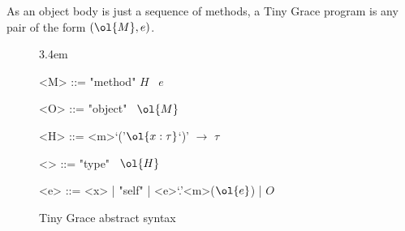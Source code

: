 As an object body is just a sequence of methods, a Tiny Grace program is any
pair of the form $(\ol{M}, e)$.

\begin{figure}[h]
  \centering

  \grammarindent3.4em
  \renewcommand{\grammarlabel}[2]{$#1$\hfill#2}
  \renewcommand{\syntleft}{\itshape}
  \renewcommand{\syntright}{}
  \renewcommand{\ulitleft}{\sffamily\bfseries}
  \renewcommand{\litleft}{\sffamily}
  \renewcommand{\litright}{}

  \vspace{1em}
  \begin{minipage}{11.7em}
    \begin{grammar}
      <M> ::= "method" $H$ \bo~$e$ \bc

      <O> ::= "object" \bo~$\ol{M}$ \bc

      <H> ::= <m>`('$\ol{x : \tau}$`)' $\to$ $\tau$

      <\tau> ::= "type" \bo~$\ol{H}$ \bc

      <e> ::= <x> | "self" | <e>`.'<m>($\ol{e}$) | $O$
    \end{grammar}
  \end{minipage}

  \caption{Tiny Grace abstract syntax}\label{fig:abstract-syntax}
\end{figure}

